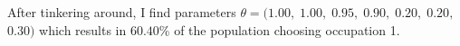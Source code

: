 After tinkering around, I find parameters $ \theta = ($$1.00$$,\;$$1.00$$,\;$$0.95$$,\;$$0.90$$,\;$$0.20$$,\;$$0.20$$,\;$$0.30$$)$ which results in $60.40$\% of the population choosing occupation 1.